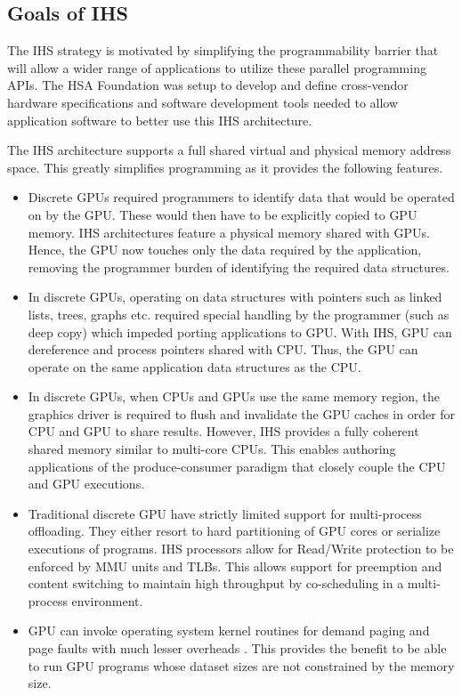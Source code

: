 \subsection{Goals of IHS}
The IHS strategy is motivated by simplifying the programmability barrier that will allow a wider range of applications to utilize these parallel programming APIs. The HSA Foundation \cite{hsafoundation} was setup to develop and define cross-vendor hardware specifications and software development tools needed to allow application software to better use this IHS architecture.
\par The IHS architecture supports a full shared virtual and physical memory address space. This greatly simplifies programming as it provides the following features.
\begin{itemize}
	\item Discrete GPUs required programmers to identify data that would be operated on by the GPU. These would then have to be explicitly copied to GPU memory. IHS architectures feature a physical memory shared with GPUs. Hence, the GPU now touches only the data required by the application, removing the programmer burden of identifying the required data structures.	
	\item In discrete GPUs, operating on data structures with pointers such as linked lists, trees, graphs etc. required special handling by the programmer (such as deep copy) which impeded porting applications to GPU. With IHS, GPU can dereference and process pointers shared with CPU. Thus, the GPU can operate on the same application data structures as the CPU.
	\item In discrete GPUs, when CPUs and GPUs use the same memory region, the graphics driver is required to flush and invalidate the GPU caches in order for CPU and GPU to share results. However, IHS provides a fully coherent shared memory similar to multi-core CPUs. This enables authoring applications of the produce-consumer paradigm that closely couple the CPU and GPU executions.
	\item Traditional discrete GPU have strictly limited support for multi-process offloading. They either resort to hard partitioning of GPU cores or serialize executions of programs. IHS processors allow for Read/Write protection to be enforced by MMU units and TLBs. This allows support for preemption and content switching to maintain high throughput by co-scheduling in a multi-process environment.
	\item GPU can invoke operating system kernel routines for demand paging and page faults with much lesser overheads \cite{tlb-translation}. This provides the benefit to be able to run GPU programs whose dataset sizes are not constrained by the memory size. 

\end{itemize}
